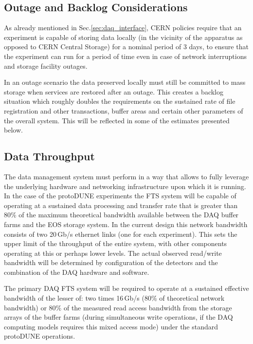 \documentclass[12pt]{article}
\newcommand{\pd}{protoDUNE\xspace}
\begin{document}
\subsection{Outage and Backlog Considerations}
\label{sec:backlog}
As already mentioned in Sec.\ref{sec:daq_interface},
CERN policies require that an experiment is capable of storing data locally (in the vicinity of the apparatus as opposed to CERN Central
Storage)  for a nominal period of 3 days, to ensure that the experiment can run for a period of time even in case of network interruptions
and storage facility outages.

In an outage scenario the data preserved locally must still be committed to mass storage when services are
restored after an outage. This creates a backlog situation which roughly doubles the requirements on the sustained
rate of file registration and other transactions, buffer areas and certain other parameters of the overall system.
This will be reflected in some of the estimates presented below.


\subsection{Data Throughput}

The data management system must perform in a way that allows to fully leverage the underlying hardware and networking infrastructure
upon which  it is running.  In the case of the \pd experiments the FTS system will be capable of operating at a sustained data processing and transfer
rate that is greater than 80\% of the maximum theoretical bandwidth available between the DAQ buffer farms and the EOS storage system.
In the current design this network bandwidth consists of two 20\,Gb/s ethernet links (one for each experiment).
This sets the upper limit of the throughput of the entire system, with other components operating at this or perhaps lower levels.
The actual observed read/write bandwidth will be determined by configuration of the detectors and the combination
of the DAQ hardware and software.


  The primary DAQ FTS system will be required to operate at a sustained effective bandwidth
of the lesser of: two times 16\,Gb/s (80\% of theoretical network bandwidth) or 80\% of the measured read access bandwidth from the storage arrays
of the buffer farms
(during simultaneous write operations, if the DAQ computing models requires this mixed access mode) under the standard \pd operations.
\end{document}
